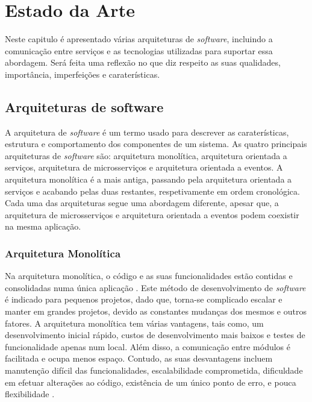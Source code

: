 
\chapter{Estado da Arte}	%
\label{Chapter2}	%

Neste capitulo é apresentado várias arquiteturas de \textit{software}, incluindo a comunicação entre serviços e as tecnologias utilizadas para suportar essa abordagem. Será feita uma reflexão no que diz respeito as suas qualidades, importância, imperfeições e caraterísticas.

\section{Arquiteturas de software}
A arquitetura de \textit{software} é um termo usado para descrever as caraterísticas, estrutura e comportamento dos componentes de um sistema. As quatro principais arquiteturas de \textit{software} são: arquitetura monolítica, arquitetura orientada a serviços, arquitetura de microsserviços e arquitetura orientada a eventos. A arquitetura monolítica é a mais antiga, passando pela arquitetura orientada a serviços e acabando pelas duas restantes, respetivamente em ordem cronológica. Cada uma das arquiteturas segue uma abordagem diferente, apesar que, a arquitetura de microsserviços e arquitetura orientada a eventos podem coexistir na mesma aplicação.

\subsection{Arquitetura Monolítica}

Na arquitetura monolítica, o código e as suas funcionalidades estão contidas e consolidadas numa única aplicação \cite{monolitico}. Este método de desenvolvimento de \textit{software} é indicado para pequenos projetos, dado que, torna-se complicado escalar e manter em grandes projetos, devido as constantes mudanças dos mesmos e outros fatores.
A arquitetura monolítica tem várias vantagens, tais como, um desenvolvimento inicial rápido, custos de desenvolvimento mais baixos e testes de funcionalidade apenas num local. Além disso, a comunicação entre módulos é facilitada e ocupa menos espaço. Contudo, as suas desvantagens incluem manutenção difícil das funcionalidades, escalabilidade comprometida, dificuldade em efetuar alterações ao código, existência de um único ponto de erro, e pouca flexibilidade \cite{monoliticoVandDes}.

